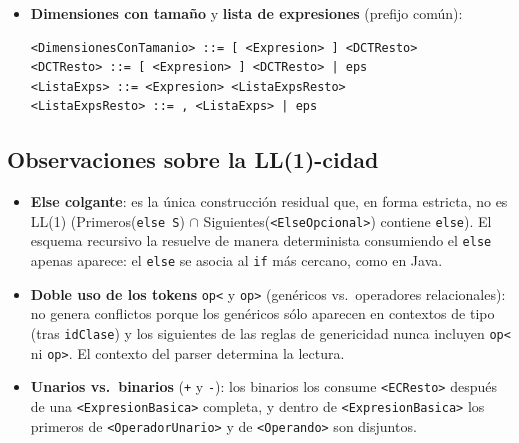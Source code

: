 \documentclass[11pt,a4paper]{article}
\begin{document}
\begin{itemize}
        prefijo \texttt{idMetVar}; \texttt{<CrearArreglo>} y \texttt{<LlamadaConstructor>}
        comparten \texttt{new} y la estructura de \texttt{<TipoBase>} (que a su vez incluye
        \texttt{<TipoReferencia>}):
{\footnotesize
\begin{verbatim}
<Primario> ::= idMetVar <MetodoOVar> | new <ArregloOConstructor> | ...
<MetodoOVar> ::= <ArgsActuales> | eps
<ArregloOConstructor> ::= <TipoReferencia> <AOC2>
                        | <TipoPrimitivo> <DimensionesConTamanio>
                        | idGen <DimensionesConTamanio>
<AOC2> ::= <ArgsActuales> | <DimensionesConTamanio>
\end{verbatim}}
        De la misma forma, en \texttt{<RResto>} los encadenados \texttt{. idMetVar} y
        \texttt{. idMetVar <ArgsActuales>} se factorizan en
        \texttt{. idMetVar <MetodoOVar>}.
  \item \textbf{Dimensiones con tamaño} y \textbf{lista de expresiones} (prefijo común):
{\footnotesize
\begin{verbatim}
<DimensionesConTamanio> ::= [ <Expresion> ] <DCTResto>
<DCTResto> ::= [ <Expresion> ] <DCTResto> | eps
<ListaExps> ::= <Expresion> <ListaExpsResto>
<ListaExpsResto> ::= , <ListaExps> | eps
\end{verbatim}}
\end{itemize}

\subsection{Observaciones sobre la LL(1)-cidad}

\begin{itemize}
  \item \textbf{Else colgante}: es la única construcción residual que, en forma estricta,
        no es LL(1) (Primeros(\texttt{else S}) $\cap$ Siguientes(\texttt{<ElseOpcional>})
        contiene \texttt{else}). El esquema recursivo la resuelve de manera determinista
        consumiendo el \texttt{else} apenas aparece: el \texttt{else} se asocia al
        \texttt{if} más cercano, como en Java.
  \item \textbf{Doble uso de los tokens} \verb!op<! y \verb!op>! (genéricos vs.\ operadores
        relacionales): no genera conflictos porque los genéricos sólo aparecen en contextos
        de tipo (tras \texttt{idClase}) y los siguientes de las reglas de genericidad nunca
        incluyen \verb!op<! ni \verb!op>!. El contexto del parser determina la lectura.
  \item \textbf{Unarios vs.\ binarios} (\texttt{+} y \texttt{-}): los binarios los consume
        \texttt{<ECResto>} después de una \texttt{<ExpresionBasica>} completa, y dentro de
        \texttt{<ExpresionBasica>} los primeros de \texttt{<OperadorUnario>} y de
        \texttt{<Operando>} son disjuntos.
\end{itemize}
\end{document}
